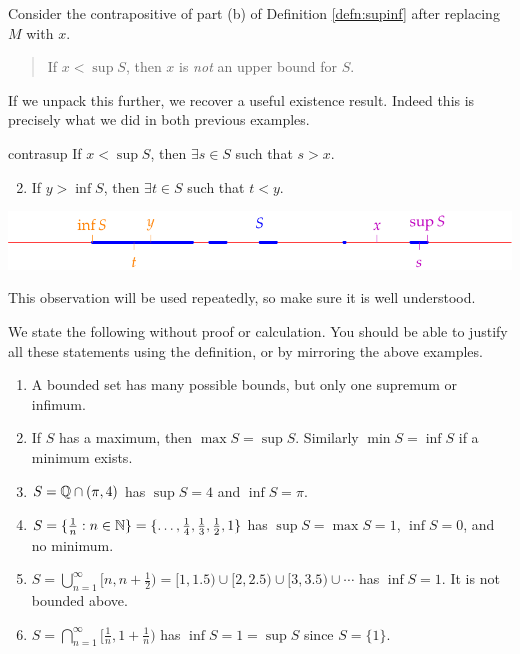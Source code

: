 
Consider the contrapositive of part (b) of Definition \ref{defn:supinf} after replacing $M$ with $x$.

\begin{quote}
	If $x<\sup S$, then $x$ is \emph{not} an upper bound for $S$.
\end{quote}

If we unpack this further, we recover a useful existence result. Indeed this is precisely what we did in both previous examples.

\begin{lemm}{}{contrasup}
	\exstart If $x<\sup S$, then $\exists s\in S$ such that $s>x$.
	\begin{enumerate}\setcounter{enumi}{1}
	  \item If $y>\inf S$, then $\exists t\in S$ such that $t<y$.
	\end{enumerate}

\begin{center}
	\includegraphics{supinf4}
\end{center}
\end{lemm}

This observation will be used repeatedly, so make sure it is well understood.

\begin{examples}{}{}
	We state the following without proof or calculation. You should be able to justify all these statements using the definition, or by mirroring the above examples.
	\begin{enumerate}
		\item A bounded set has many possible bounds, but only one supremum or infimum.
		\item If $S$ has a maximum, then $\max S=\sup S$. Similarly $\min S=\inf S$ if a minimum exists.
		\item $S=\mathbb{Q}\cap (\pi,4)$ has $\sup S=4$ and $\inf S=\pi$.
		\item $S=\{\frac 1n:n\in\mathbb{N}\}=\{\ldots,\frac 14,\frac 13,\frac 12,1\}$ has $\sup S=\max S=1$, $\inf S=0$, and no minimum.
		\item $S=\bigcup\limits_{n=1}^\infty [n,n+\frac 12)=[1,1.5)\cup[2,2.5)\cup[3,3.5)\cup\cdots$ has $\inf S=1$. It is not bounded above.
		\item $S=\bigcap\limits_{n=1}^\infty [\frac 1n,1+\frac 1n)$ has $\inf S=1=\sup S$ since $S=\{1\}$.
	\end{enumerate}
\end{examples}


